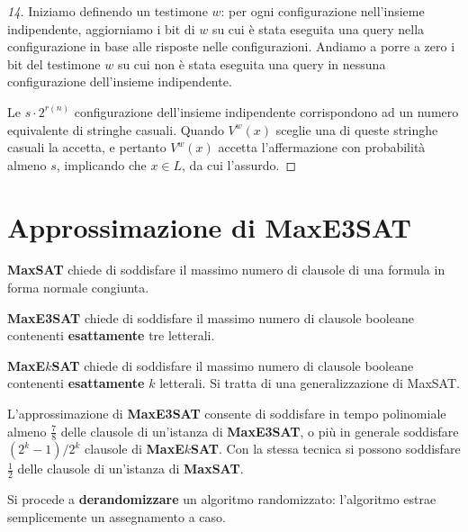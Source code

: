 \documentclass[\main/main.tex]{subfiles}
\begin{document}
\begin{multicols}{2}
\begin{proof}[14]
    Iniziamo definendo un testimone \(w\): per ogni configurazione nell'insieme indipendente, aggiorniamo i bit di \(w\) su cui è stata eseguita una query nella configurazione in base alle risposte nelle configurazioni. Andiamo a porre a zero i bit del testimone \(w\) su cui non è stata eseguita una query in nessuna configurazione dell'insieme indipendente.
    
    Le \(s \cdot 2^{r(n)}\) configurazione dell'insieme indipendente corrispondono ad un numero equivalente di stringhe casuali. Quando \(V^{w}(x)\) sceglie una di queste stringhe casuali la accetta, e pertanto \(V^{w}(x)\) accetta l'affermazione con probabilità almeno \(s\), implicando che \(x \in L\), da cui l'assurdo.
\end{proof}
\end{multicols}
\clearpage
\section{Approssimazione di MaxE3SAT}
\begin{multicols}{2}
\begin{problem}[MaxSAT]
    \textbf{MaxSAT} chiede di soddisfare il massimo numero di clausole di una formula in forma normale congiunta.
\end{problem}
\begin{problem}
    \textbf{MaxE3SAT} chiede di soddisfare il massimo numero di clausole booleane contenenti \textbf{esattamente} tre letterali.
\end{problem}
\begin{problem}
    \textbf{MaxE\(k\)SAT} chiede di soddisfare il massimo numero di clausole booleane contenenti \textbf{esattamente} \(k\) letterali. Si tratta di una generalizzazione di MaxSAT.
\end{problem}
\begin{observation}
    L'approssimazione di \textbf{MaxE3SAT} consente di soddisfare in tempo polinomiale almeno \(\frac{7}{8}\) delle clausole di un'istanza di \textbf{MaxE3SAT}, o più in generale soddisfare \(\left(2^{k}-1\right) / 2^{k}\) clausole di \textbf{MaxE\(k\)SAT}. Con la stessa tecnica si possono soddisfare \(\frac{1}{2}\) delle clausole di un'istanza di \textbf{MaxSAT}.
\end{observation}
\begin{observation}
    Si procede a \textbf{derandomizzare} un algoritmo randomizzato: l'algoritmo estrae semplicemente un assegnamento a caso.
\end{observation}
\end{multicols}
\end{document}
